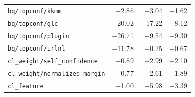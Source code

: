 \begin{tabular}{lrrr}
\texttt{bq/topconf/kkmm} & $-$2.86 & +3.04 & +1.62 \\
\texttt{bq/topconf/glc} & $-$20.02 & $-$17.22 & $-$8.12 \\
\texttt{bq/topconf/plugin} & $-$26.71 & $-$9.54 & $-$9.30 \\
\texttt{bq/topconf/irlnl} & $-$11.78 & $-$0.25 & +0.67 \\
\texttt{cl\_weight/self\_confidence} & +0.89 & +2.99 & +2.10 \\
\texttt{cl\_weight/normalized\_margin} & +0.77 & +2.61 & +1.89 \\
\texttt{cl\_feature} & +1.00 & +5.98 & +3.39 \\
\bottomrule
\end{tabular}
